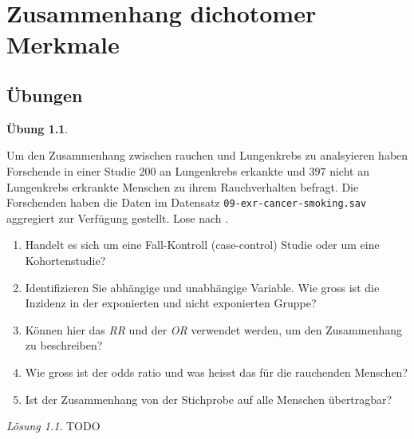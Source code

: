 \documentclass[
]{book}
\providecommand{\tightlist}{%
  \setlength{\itemsep}{0pt}\setlength{\parskip}{0pt}}
\theoremstyle{definition}
\theoremstyle{definition}
\theoremstyle{definition}
\newtheorem{exercise}{Übung}[chapter]
\theoremstyle{definition}
\theoremstyle{remark}
\newtheorem*{solution}{Lösung}
\begin{document}
\chapter{Zusammenhang dichotomer Merkmale}\label{zusammenhang-dichotomer-merkmale}

\section{Übungen}\label{uxfcbungen-6}

\begin{exercise}
\protect\hypertarget{exr:cancer-smoking}{}\label{exr:cancer-smoking}\leavevmode

Um den Zusammenhang zwischen rauchen und Lungenkrebs zu analsyieren haben Forschende in einer Studie \(200\) an Lungenkrebs erkankte und \(397\) nicht an Lungenkrebs erkrankte Menschen zu ihrem Rauchverhalten befragt. Die Forschenden haben die Daten im Datensatz \texttt{09-exr-cancer-smoking.sav} aggregiert zur Verfügung gestellt. Lose nach \citet{matos1998}.

\begin{enumerate}
\def\labelenumi{\alph{enumi})}
\tightlist
\item
  Handelt es sich um eine Fall-Kontroll (case-control) Studie oder um eine Kohortenstudie?
\item
  Identifizieren Sie abhängige und unabhängige Variable. Wie gross ist die Inzidenz in der exponierten und nicht exponierten Gruppe?
\item
  Können hier das \emph{RR} und der \emph{OR} verwendet werden, um den Zusammenhang zu beschreiben?
\item
  Wie gross ist der odds ratio und was heisst das für die rauchenden Menschen?
\item
  Ist der Zusammenhang von der Stichprobe auf alle Menschen übertragbar?
\end{enumerate}

\end{exercise}

\begin{solution}
TODO
\end{solution}
\end{document}
